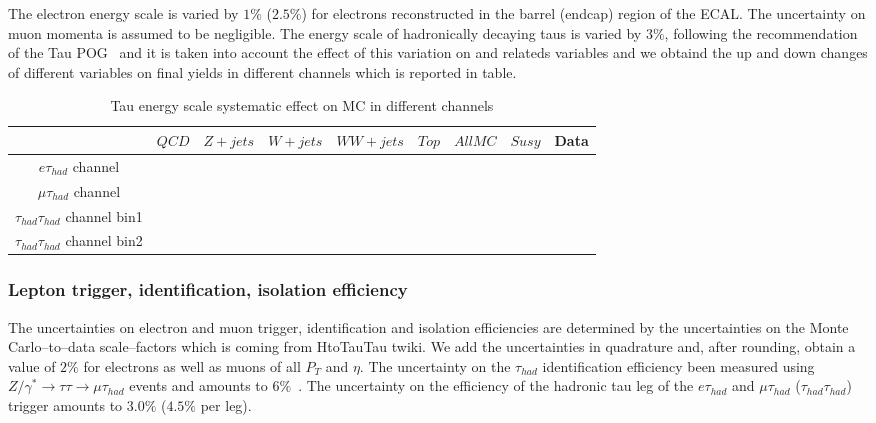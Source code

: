 The electron energy scale is varied by $1\%$ ($2.5\%$) for electrons reconstructed in the barrel (endcap) region of the ECAL.
The uncertainty on muon momenta is assumed to be negligible. The energy scale of hadronically decaying taus is varied by $3\%$, following the recommendation of the Tau POG~\cite{TauPOG} and it is taken into account the effect of this variation on \met and \pT relateds variables and we obtaind the up and down changes of different variables on final yields in different channels which is reported in table.

\begin{table}[!h]
\begin{center}
\begin{tabular}{|c|c|c|c|c|c|c|c|c|}
\hline
                                    &$QCD$&$Z+jets$&$W+jets$&$WW+jets$&$Top$& $All MC$ & $Susy$ & Data \\\hline 
$e\tau_{had}$ channel               &     &        &        &         &     &          &        &      \\\hline   
$\mu\tau_{had}$ channel             &     &        &        &         &     &          &        &      \\\hline  
$\tau_{had}\tau_{had}$ channel bin1 &     &        &        &         &     &          &        &      \\\hline
$\tau_{had}\tau_{had}$ channel bin2 &     &        &        &         &     &          &        &      \\\hline
\end{tabular} 
\end{center}
\caption{Tau energy scale systematic effect on MC in different channels
}
\label{Tab.susyHiggs}
\end{table}     


\subsubsection{Lepton trigger, identification, isolation efficiency}

  The uncertainties on electron and muon trigger, identification and isolation efficiencies
  are determined by the uncertainties on the Monte Carlo--to--data scale--factors 
  which is coming from HtoTauTau twiki.
  We add the uncertainties in quadrature and, after rounding, obtain a value of $2\%$ for electrons as well as muons of all $P_{T}$ and $\eta$.
  The uncertainty on the $\tau_{had}$ identification efficiency 
  been measured using $Z/\gamma^{*} \to \tau\tau \to \mu\tau_{had}$ events
  and amounts to $6\%$~\cite{TauPOG}.
  The uncertainty on the efficiency of the hadronic tau leg of the $e\tau_{had}$ and $\mu\tau_{had}$ ($\tau_{had}\tau_{had}$) trigger
  amounts to $3.0\%$ ($4.5\%$ per leg).

